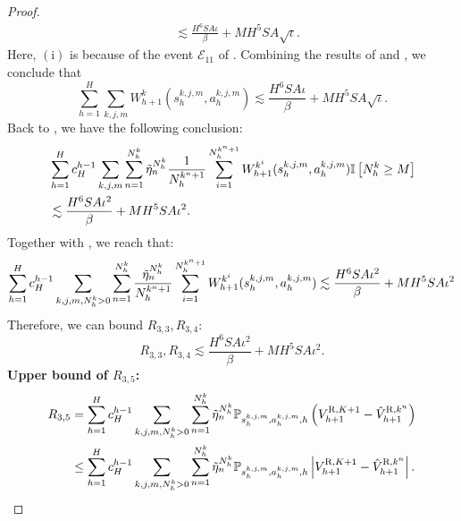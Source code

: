 \documentclass{article}
\newcommand{\R}{\textnormal{R}}
\begin{document}
\begin{proof}
\begin{align}
&\lesssim \frac{H^6SA\iota}{\beta}+ MH^5SA\sqrt{\iota}. 
\end{align}
Here, $\mathrm{(i)}$ is because of the event $\mathcal{E}_{11}$ of . Combining the results of  and , we conclude that
$$\sum_{h=1}^H\sum_{k,j,m}W_{h+1}^{k}(s_{h}^{k,j,m},a_{h}^{k,j,m}) \lesssim \frac{H^6SA\iota}{\beta}+ MH^5SA\sqrt{\iota}.$$ 
Back to , we have the following conclusion:
\begin{align*}
    &\sum_{h=1}^H c_H^{h-1}\sum_{k,j,m}\sum_{n=1}^{N_h^k} \Tilde{\eta}_n^{N_h^k}\frac{1}{N_h^{k^n+1}} \sum_{i=1}^{N_h^{k^n+1}}W_{h+1}^{k^i}(s_{h}^{k,j,m},a_{h}^{k,j,m})\mathbb{I}\left[N_h^k\geq M\right] \nonumber\\
    &\lesssim \frac{H^6SA\iota^2}{\beta}+ MH^5SA\iota^2.
\end{align*}
Together with , we reach that:
\begin{align}
    \label{upperW}
    \sum_{h=1}^H c_H^{h-1}\sum_{k,j,m,N_h^k >0}\sum_{n=1}^{N_h^k} \frac{\Tilde{\eta}_n^{N_h^k}}{N_h^{k^n+1}} \sum_{i=1}^{N_h^{k^n+1}}W_{h+1}^{k^i}(s_{h}^{k,j,m},a_{h}^{k,j,m}) \lesssim \frac{H^6SA\iota^2}{\beta}+ MH^5SA\iota^2
\end{align}
Therefore, we can bound $R_{3,3}, R_{3,4}$:
\begin{equation}
    \label{r33}
    R_{3,3}, R_{3,4} \lesssim \frac{H^6SA\iota^2}{\beta}+ MH^5SA\iota^2.
\end{equation}
\textbf{Upper bound of $R_{3,5}$:}
\begin{align*}
    R_{3,5} &= \sum_{h=1}^H c_H^{h-1}\sum_{k,j,m,N_h^k >0}\sum_{n=1}^{N_h^k} \Tilde{\eta}_n^{N_h^k}\mathbb{P}_{s_h^{k,j,m}, a_h^{k,j,m},h}\left(V_{h+1}^{\R,K+1}-\hat{V}_{h+1}^{\R,k^n}\right) \\
    &\leq \sum_{h=1}^H c_H^{h-1}\sum_{k,j,m,N_h^k >0}\sum_{n=1}^{N_h^k} \Tilde{\eta}_n^{N_h^k}\mathbb{P}_{s_h^{k,j,m}, a_h^{k,j,m},h}\left|V_{h+1}^{\R,K+1}-\hat{V}_{h+1}^{\R,k^n}\right|.
\end{align*}


\end{proof}
\end{document}
